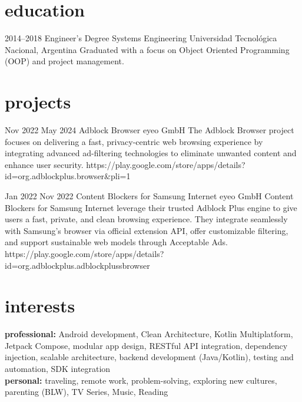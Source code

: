 \documentclass[a4paper,nocolors]{friggeri-cv}
\begin{document}

\section{education}

\begin{entrylist}


\entry
{2014--2018}
{Engineer’s Degree {\normalfont Systems Engineering}}
{Universidad Tecnológica Nacional, Argentina}
{Graduated with a focus on Object Oriented Programming (OOP) and project management.}

\end{entrylist}


\section{projects}
\begin{entrylist}
\entryproject
{Nov 2022}
{May 2024}
{Adblock Browser}
{eyeo GmbH}
{
  The Adblock Browser project focuses on delivering a fast, privacy-centric web
  browsing experience by integrating advanced ad-filtering technologies to eliminate
  unwanted content and enhance user security.
}
{https://play.google.com/store/apps/details?id=org.adblockplus.browser&pli=1}

\entryproject
{Jan 2022}
{Nov 2022}
{Content Blockers for Samsung Internet}
{eyeo GmbH}
{
  Content Blockers for Samsung Internet leverage their trusted Adblock Plus engine to give users a fast, private, and clean browsing experience. They integrate seamlessly with Samsung’s browser via official extension API, offer customizable filtering, and support sustainable web models through Acceptable Ads.
}
{https://play.google.com/store/apps/details?id=org.adblockplus.adblockplussbrowser}

\end{entrylist} 
\section{interests}

\textbf{professional:} Android development, Clean Architecture, Kotlin Multiplatform, Jetpack Compose, modular app design, RESTful API integration, dependency injection, scalable architecture, backend development (Java/Kotlin), testing and automation, SDK integration \\
\textbf{personal:} traveling, remote work, problem-solving, exploring new cultures, parenting (BLW), TV Series, Music, Reading
 
\end{document}
